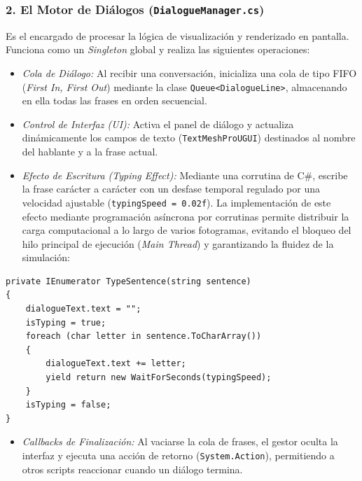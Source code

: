 \subsubsection{2. El Motor de Diálogos (\texttt{DialogueManager.cs})}
Es el encargado de procesar la lógica de visualización y renderizado en pantalla. Funciona como un \textit{Singleton} global y realiza las siguientes operaciones:
\begin{itemize}
    \item \textit{Cola de Diálogo:} Al recibir una conversación, inicializa una cola de tipo FIFO (\textit{First In, First Out}) mediante la clase \texttt{Queue<DialogueLine>}, almacenando en ella todas las frases en orden secuencial.
    \item \textit{Control de Interfaz (UI):} Activa el panel de diálogo y actualiza dinámicamente los campos de texto (\texttt{TextMeshProUGUI}) destinados al nombre del hablante y a la frase actual.
    \item \textit{Efecto de Escritura (Typing Effect):} Mediante una corrutina de C\#, escribe la frase carácter a carácter con un desfase temporal regulado por una velocidad ajustable (\texttt{typingSpeed = 0.02f}). La implementación de este efecto mediante programación asíncrona por corrutinas permite distribuir la carga computacional a lo largo de varios fotogramas, evitando el bloqueo del hilo principal de ejecución (\textit{Main Thread}) y garantizando la fluidez de la simulación:
\end{itemize}
\begin{verbatim}
private IEnumerator TypeSentence(string sentence)
{
    dialogueText.text = "";
    isTyping = true;
    foreach (char letter in sentence.ToCharArray())
    {
        dialogueText.text += letter;
        yield return new WaitForSeconds(typingSpeed);
    }
    isTyping = false;
}
\end{verbatim}
\begin{itemize}
    \item \textit{Callbacks de Finalización:} Al vaciarse la cola de frases, el gestor oculta la interfaz y ejecuta una acción de retorno (\texttt{System.Action}), permitiendo a otros scripts reaccionar cuando un diálogo termina.
\end{itemize}

